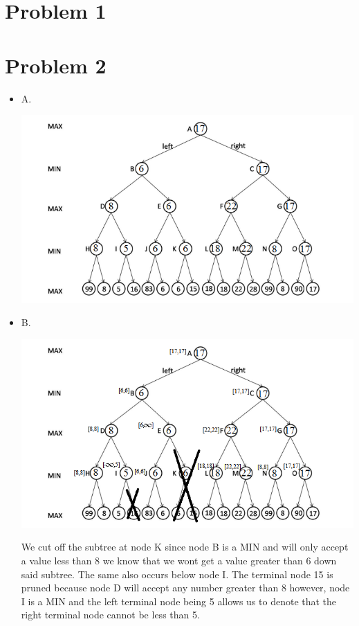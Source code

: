 \documentclass[10pt,a4paper]{article}
\begin{document}
	
	\section*{Problem 1}
	
	
	
	\section*{Problem 2}
	
	\begin{itemize}
		\item
		A. 
		\begin{center}
			\includegraphics[scale=0.5]{Minimax}
		\end{center}
		\item
		B. 
		\begin{center}
			\includegraphics[scale=0.5]{Pruning}
		\end{center}
		
		We cut off the subtree at node K since node B is a MIN and will only accept a value less than 8 we know that we wont get a value greater than 6 down said subtree. The same also occurs below node I. The terminal node 15 is pruned because node D will accept any number greater than 8 however, node I is a MIN and the left terminal node being 5 allows us to denote that the right terminal node cannot be less than 5.
		

\end{itemize}
\end{document}
